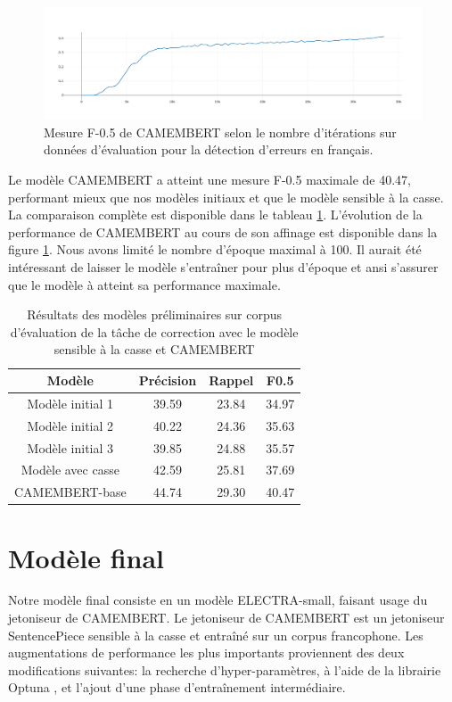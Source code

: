 \documentclass[12pt,twoside,maitrise]{dms}
\theoremstyle{definition}
\numberwithin{equation}{section}
\numberwithin{table}{chapter}
\numberwithin{figure}{chapter}
\begin{document}
\begin{figure}
	\begin{center}
		\includegraphics[width=1.0\textwidth]{figures/camembertbasef05100epoquesnat.png}
	\end{center}
	\caption{Mesure F-0.5 de CAMEMBERT selon le nombre d'itérations sur
		données d'évaluation pour la détection d'erreurs en
		français.}\label{fig:f05camembert}
\end{figure}

Le modèle CAMEMBERT a atteint une mesure F-0.5 maximale de 40.47, performant
mieux que nos modèles initiaux et que le modèle sensible à la casse. La
comparaison complète est disponible dans le tableau
\ref{table:perf_initiaux_camembert}. L'évolution de la performance de CAMEMBERT
au cours de son affinage est disponible dans la figure \ref{fig:f05camembert}.
Nous avons limité le nombre d'époque maximal à 100. Il aurait été intéressant
de laisser le modèle s'entraîner pour plus d'époque et ansi s'assurer que le
modèle à atteint sa performance maximale.

\begin{table}
	\centering
	\begin{tabular}{||c | c | c | c||}
		\hline
		Modèle            & Précision & Rappel & F0.5  \\ [0.5ex]
		\hline\hline
		Modèle initial 1  & 39.59     & 23.84  & 34.97 \\
		Modèle initial 2  & 40.22     & 24.36  & 35.63 \\
		Modèle initial 3  & 39.85     & 24.88  & 35.57 \\
		Modèle avec casse & 42.59     & 25.81  & 37.69 \\
		CAMEMBERT-base    & 44.74     & 29.30  & 40.47 \\
		\hline
	\end{tabular}
	\caption{Résultats des modèles préliminaires sur corpus d'évaluation de la tâche de correction avec le modèle sensible à la casse et CAMEMBERT}
	\label{table:perf_initiaux_camembert}
\end{table}


\chapter{Modèle final}\label{chapitre:meilleurmodele}
Notre modèle final consiste en un modèle ELECTRA-small, faisant usage du
jetoniseur de CAMEMBERT. Le jetoniseur de CAMEMBERT est un jetoniseur
SentencePiece sensible à la casse et entraîné sur un corpus francophone. Les
augmentations de performance les plus importants proviennent des deux
modifications suivantes: la recherche d'hyper-paramètres, à l'aide de la
librairie Optuna \cite{akiba2019optuna}, et l'ajout d'une phase d'entraînement
intermédiaire.
\end{document}
